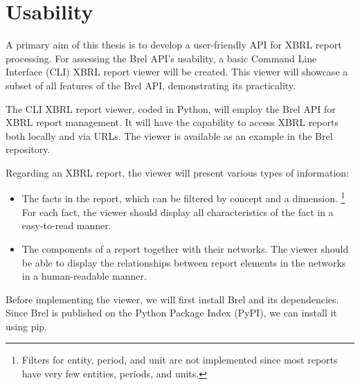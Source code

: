 \section{Usability}
\label{sec:usability}



A primary aim of this thesis is to develop a user-friendly API for XBRL report processing.  
For assessing the Brel API's usability, a basic Command Line Interface (CLI) XBRL report viewer will be created.  
This viewer will showcase a subset of all features of the Brel API, demonstrating its practicality.

The CLI XBRL report viewer, coded in Python, will employ the Brel API for XBRL report management.  
It will have the capability to access XBRL reports both locally and via URLs.
The viewer is available as an example in the Brel repository\cite{brel_source}.

Regarding an XBRL report, the viewer will present various types of information:

\begin{itemize}
    \item The facts in the report, which can be filtered by concept and a dimension.
    \footnote{Filters for entity, period, and unit are not implemented since most reports have very few entities, periods, and units.}
    For each fact, the viewer should display all characteristics of the fact in a easy-to-read manner.
    \item The components of a report together with their networks.
    The viewer should be able to display the relationships between report elements in the networks in a human-readable manner.
\end{itemize}

Before implementing the viewer, we will first install Brel and its dependencies.
Since Brel is published on the Python Package Index (PyPI), we can install it using pip.

